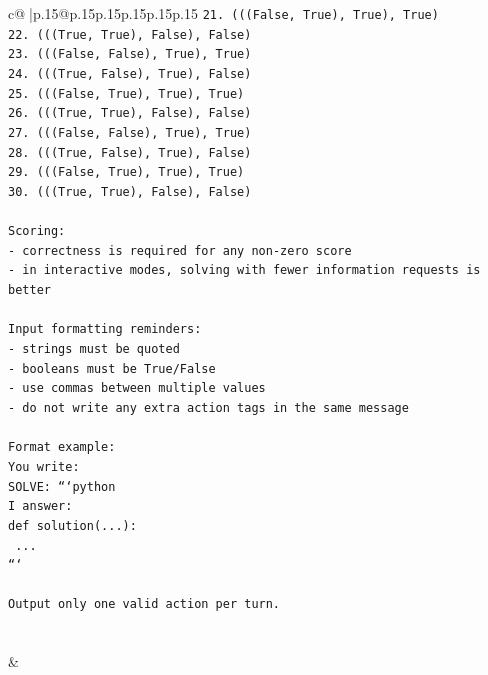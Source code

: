 \documentclass{article}
\begin{document}
{\begin{supertabular}{c@{$\;$}|p{.15\linewidth}@{}p{.15\linewidth}p{.15\linewidth}p{.15\linewidth}p{.15\linewidth}p{.15\linewidth}}
{{{\texttt{21. (((False, True), True), True)} \\
\texttt{22. (((True, True), False), False)} \\
\texttt{23. (((False, False), True), True)} \\
\texttt{24. (((True, False), True), False)} \\
\texttt{25. (((False, True), True), True)} \\
\texttt{26. (((True, True), False), False)} \\
\texttt{27. (((False, False), True), True)} \\
\texttt{28. (((True, False), True), False)} \\
\texttt{29. (((False, True), True), True)} \\
\texttt{30. (((True, True), False), False)} \\
\\ 
\texttt{Scoring:} \\
\texttt{{-} correctness is required for any non{-}zero score} \\
\texttt{{-} in interactive modes, solving with fewer information requests is better} \\
\\ 
\texttt{Input formatting reminders:} \\
\texttt{{-} strings must be quoted} \\
\texttt{{-} booleans must be True/False} \\
\texttt{{-} use commas between multiple values} \\
\texttt{{-} do not write any extra action tags in the same message} \\
\\ 
\texttt{Format example:} \\
\texttt{You write:} \\
\texttt{SOLVE: ```python} \\
\texttt{I answer:} \\
\texttt{def solution(...):} \\
\texttt{    ...} \\
\texttt{```} \\
\\ 
\texttt{Output only one valid action per turn.} \\
            }
        }
    }
     \\ \\

    \theutterance {}  
    & 
\end{supertabular}}
\end{document}
